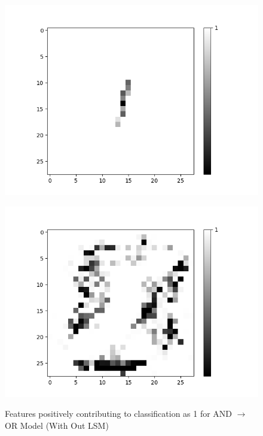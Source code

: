 \begin{minipage}[t]{0.45\textwidth}
	\begin{figure}[H]
			\centering
		\begin{minipage}[b]{0.5\textwidth}
			\captionsetup{labelformat=empty}
			\includegraphics[width=\textwidth]{AND-OR(WO-LSM)(1)/Like/True/Layer0-Neuron-3.png}
			\label{}
		\end{minipage}
		
		\medskip
		
		\begin{minipage}[b]{0.5\textwidth}
			\captionsetup{labelformat=empty}
			\includegraphics[width=\textwidth]{AND-OR(WO-LSM)(1)/Like/False/Layer0-Neuron-3.png}
			\label{}
		\end{minipage}
		\caption{Features positively contributing to classification as 1 for AND $\rightarrow$ OR Model (With Out LSM)}
		\label{fig:and-or-with-out-lsm-lnn-features-pos}
	\end{figure}
\end{minipage}


